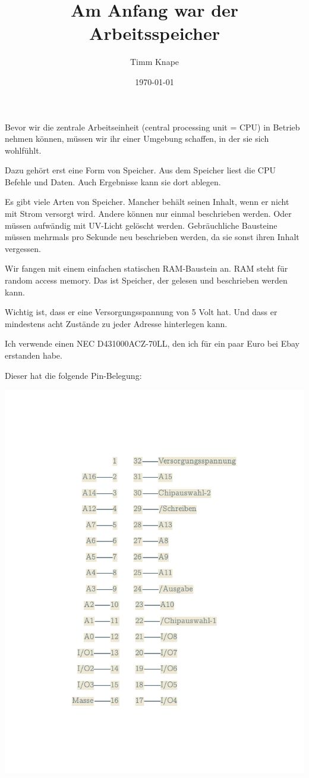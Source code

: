 \documentclass[a5paper,ngerman]{article}
\title{\color{emph}Am Anfang war der Arbeitsspeicher}
\author{Timm Knape}
\date{\today}
\begin{document}
\pagecolor{background}
\color{normal}
\allsectionsfont{\color{emph}\mdseries}
\pagestyle{plain}
\maketitle
\thispagestyle{fancy}
\begin{multicols}{2}

Bevor wir die zentrale Arbeitseinheit (central processing unit = CPU)
in Betrieb nehmen können,
müssen wir ihr einer Umgebung schaffen, in der sie sich wohlfühlt.

Dazu gehört erst eine Form von Speicher.
Aus dem Speicher liest die CPU Befehle und Daten.
Auch Ergebnisse kann sie dort ablegen.

Es gibt viele Arten von Speicher.
Mancher behält seinen Inhalt, wenn er nicht mit Strom versorgt wird.
Andere können nur einmal beschrieben werden.
Oder müssen aufwändig mit UV-Licht gelöscht werden.
Gebräuchliche Bausteine müssen mehrmals pro Sekunde neu beschrieben
werden, da sie sonst ihren Inhalt vergessen.

Wir fangen mit einem einfachen statischen RAM-Baustein an.
RAM steht für random access memory.
Das ist Speicher, der gelesen und beschrieben werden kann.

Wichtig ist, dass er eine Versorgungsspannung von 5 Volt hat.
Und dass er mindestens acht Zustände zu jeder Adresse hinterlegen kann.

Ich verwende einen NEC D431000ACZ-70LL, den ich für ein paar Euro bei
Ebay erstanden habe.

Dieser hat die folgende Pin-Belegung:

\centerline{\includegraphics[trim={1in .9in 1in .9in},clip]{imgs/dot-1-light.pdf}}
\end{multicols}
\end{document}
